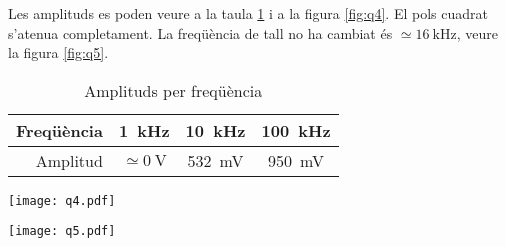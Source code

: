 \documentclass[catalan, a4paper, nobib]{tufte-handout}
\begin{document}
\newpage

 Les amplituds es poden veure a la taula \ref{tab:t2} i a la figura \ref{fig:q4}. El pols cuadrat s'atenua completament. La freqüència de tall no ha cambiat és $\simeq\qty{16}{\kilo\hertz}$, veure la figura \ref{fig:q5}.

\begin{table}
  \begin{center}
    \begin{tabular}{@{}rccc@{}}
      \toprule
      Freqüència & \qty{1}{\kilo\hertz} & \qty{10}{\kilo\hertz} & \qty{100}{\kilo\hertz} \\
      \midrule
      Amplitud & $\simeq\qty{0}{\volt}$ & \qty{532}{\milli\volt} & \qty{950}{\milli\volt} \\
      \bottomrule
    \end{tabular}
  \end{center}
  \caption{Amplituds per freqüència}
  \label{tab:t2}
\end{table}

\begin{figure*}
  \begin{center}
    \texttt{[image: q4.pdf]}
    \caption{Les tres sortides dels tres filtres respectius passa-altes}
    \label{fig:q4}
  \end{center}
\end{figure*}

\newpage

\begin{figure*}[h!]
  \begin{center}
    \texttt{[image: q5.pdf]}
    \caption{Funció de transferència de filtre passa-altes}
    \label{fig:q5}
  \end{center}
\end{figure*}



\end{document}
